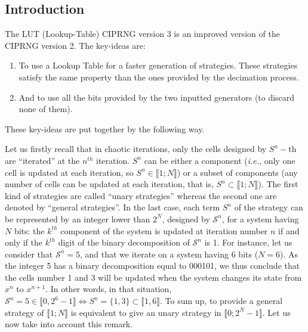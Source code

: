 \subsection{Introduction}

The LUT (Lookup-Table) CIPRNG version 3 is an improved version of the CIPRNG version 2. The key-ideas are:
\begin{enumerate}
\item To use a Lookup Table for a faster generation of strategies. 
These strategies satisfy the same property than the ones provided by the decimation process.
\item And to use all the bits provided by the two inputted generators (to discard none of them).
\end{enumerate}
These key-ideas are put together by the following way.

Let us firstly recall that in chaotic iterations, only the cells designed by $S^{n}-$th are ``iterated'' 
at the $n^{th}$ iteration.
$S^n$ can be either a component (\emph{i.e.}, only one cell is updated at each iteration, 
so $S^n \in \llbracket 1;N \rrbracket$) or a subset of components (any number of cells can be 
updated at each iteration, that is, $S^n \subset \llbracket 1;N \rrbracket$).
The first kind of strategies are called ``unary strategies'' whereas the second one are denoted by ``general strategies''.
In the last case, each term $S^n$ of the strategy can be represented by an integer lower than $2^N$, 
designed by $\mathcal{S}^n$, for a system having $N$ bits: the $k^{th}$ component of the system is 
updated at iteration number $n$ if and only if the $k^{th}$ digit of the binary decomposition of $\mathcal{S}^n$ is 1.
For instance, let us consider that $\mathcal{S}^n=5$, and that we iterate on a system having 6 bits ($N=6$).
As the integer 5 has a binary decomposition equal to 000101, we thus conclude that the cells number 1 and 3 
will be updated when the system changes its state from $x^{n}$ to $x^{n+1}$.
In other words, in that situation, $\mathcal{S}^n=5 \in \llbracket 0,2^6-1\rrbracket \Leftrightarrow 
S^n = \{1, 3\} \subset \llbracket 1, 6 \rrbracket$.
To sum up, to provide a general strategy of $\llbracket 1;N \rrbracket$ is equivalent to 
give an unary strategy in $\llbracket 0; 2^N-1 \rrbracket$.
Let us now take into account this remark.


